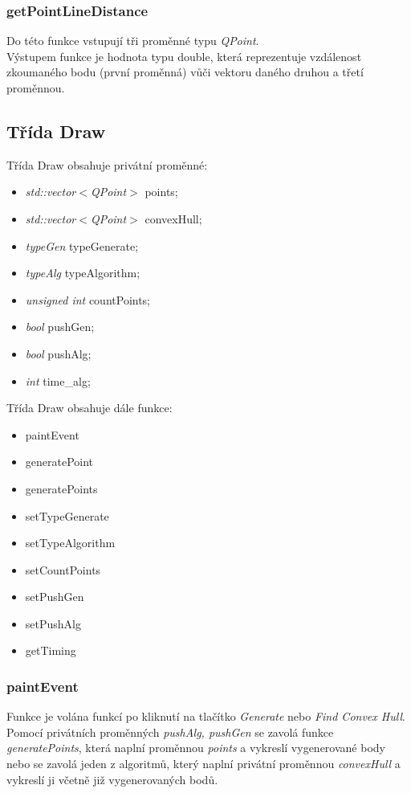 \documentclass{article}
\begin{document}
\subsubsection{getPointLineDistance}
Do této funkce vstupují tři proměnné typu \emph{QPoint}.\\
Výstupem funkce je hodnota typu double, která reprezentuje vzdálenost zkoumaného bodu (první proměnná) vůči vektoru daného druhou a třetí proměnnou.

\subsection{Třída Draw \label{sec:draw}}
Třída Draw obsahuje privátní proměnné:
\begin{itemize}
\item \emph{std::vector$<$QPoint$>$} points;
\item \emph{std::vector$<$QPoint$>$} convexHull;
\item \emph{typeGen }typeGenerate;
\item \emph{typeAlg }typeAlgorithm;
\item \emph{unsigned int }countPoints;
\item \emph{bool }pushGen;
\item \emph{bool} pushAlg;
\item \emph{int }time\_alg;
\end{itemize}

Třída Draw obsahuje dále funkce:
\begin{itemize}
\item paintEvent
\item generatePoint
\item generatePoints
\item setTypeGenerate
\item setTypeAlgorithm
\item setCountPoints
\item setPushGen
\item setPushAlg
\item getTiming
\end{itemize}

\subsubsection{paintEvent}
Funkce je volána funkcí po kliknutí na tlačítko \emph{Generate} nebo \emph{Find Convex Hull}. Pomocí privátních proměnných \emph{pushAlg, pushGen} se zavolá funkce \emph{generatePoints}, která naplní proměnnou \emph{points} a vykreslí vygenerované body nebo se zavolá jeden z algoritmů, který naplní privátní proměnnou \emph{convexHull} a vykreslí ji včetně již vygenerovaných bodů.
\end{document}
